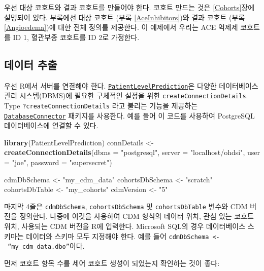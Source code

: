 \documentclass[10.5pt]{book}
\newenvironment{Shaded}{\begin{snugshade}}{\end{snugshade}}
\newcommand{\KeywordTok}[1]{\textcolor[rgb]{0.13,0.29,0.53}{\textbf{#1}}}
\newcommand{\DataTypeTok}[1]{\textcolor[rgb]{0.13,0.29,0.53}{#1}}
\newcommand{\StringTok}[1]{\textcolor[rgb]{0.31,0.60,0.02}{#1}}
\newcommand{\NormalTok}[1]{#1}
\theoremstyle{definition}
\theoremstyle{definition}
\theoremstyle{definition}
\theoremstyle{remark}
\begin{document}
우선 대상 코호트와 결과 코호트를 만들어야 한다. 코호트 만드는 것은
\ref{Cohorts}장에 설명되어 있다. 부록에선 대상 코호트 (부록
\ref{AceInhibitors})와 결과 코호트 (부록 \ref{Angioedema})에 대한 전체
정의를 제공한다. 이 예제에서 우리는 ACE 억제제 코호트를 ID 1, 혈관부종
코호트를 ID 2로 가정한다.

\subsection{데이터 추출}\label{--2}

우선 R에서 서버를 연결해야 한다.
\href{https://ohdsi.github.io/PatientLevelPrediction/}{\texttt{PatientLevelPrediction}}은
다양한 데이터베이스 관리 시스템(DBMS)에 필요한 구체적인 설정을 위한
\texttt{createConnectionDetails}. Type \texttt{?createConnectionDetails}
라고 불리는 기능을 제공하는
\href{https://ohdsi.github.io/DatabaseConnector/}{\texttt{DatabaseConnector}}
패키지를 사용한다. 예를 들어 이 코드를 사용하여 PostgreSQL
데이터베이스에 연결할 수 있다.

\begin{Shaded}
\begin{Highlighting}[]
\KeywordTok{library}\NormalTok{(PatientLevelPrediction)}
\NormalTok{connDetails <-}\StringTok{ }\KeywordTok{createConnectionDetails}\NormalTok{(}\DataTypeTok{dbms =} \StringTok{"postgresql"}\NormalTok{,}
                                       \DataTypeTok{server =} \StringTok{"localhost/ohdsi"}\NormalTok{,}
                                       \DataTypeTok{user =} \StringTok{"joe"}\NormalTok{,}
                                       \DataTypeTok{password =} \StringTok{"supersecret"}\NormalTok{)}

\NormalTok{cdmDbSchema <-}\StringTok{ "my_cdm_data"}
\NormalTok{cohortsDbSchema <-}\StringTok{ "scratch"}
\NormalTok{cohortsDbTable <-}\StringTok{ "my_cohorts"}
\NormalTok{cdmVersion <-}\StringTok{ "5"}
\end{Highlighting}
\end{Shaded}

마지막 4줄은 \texttt{cdmDbSchema}, \texttt{cohortsDbSchema} 및
\texttt{cohortsDbTable} 변수와 CDM 버전을 정의한다. 나중에 이것을
사용하여 CDM 형식의 데이터 위치, 관심 있는 코호트 위치, 사용되는 CDM
버전을 R에 입력한다. Microsoft SQL의 경우 데이터베이스 스키마는 데이터와
스키마 모두 지정해야 한다. 예를 들어
\texttt{cdmDbSchema\ \textless{}-\ “my\_cdm\_data.dbo”}이다.

먼저 코호트 항목 수를 세어 코호트 생성이 되었는지 확인하는 것이 좋다:
\end{document}
